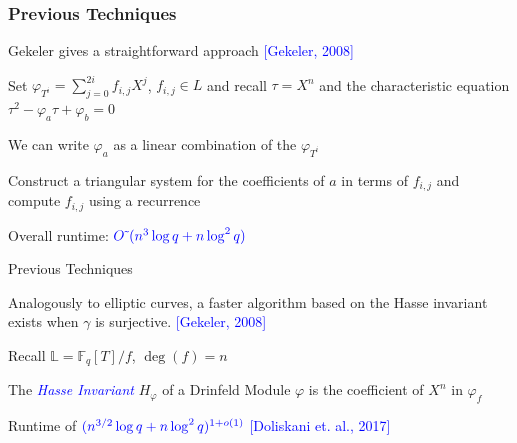 \documentclass{beamer}
\newcommand{\blue}{\textcolor{blue}}
\newcommand{\spa}{\vspace{0.2cm}}
\begin{document}





\begin{frame}
\frametitle{Previous Techniques}


     Gekeler gives a straightforward approach \blue{[Gekeler, 2008]}
     
     \spa
     
    Set $\varphi_{T^i} = \sum_{j=0}^{2i}f_{i,j} X^j$, $f_{i,j} \in L$ and recall $\tau = X^n$ and the characteristic equation $\tau^2 - \varphi_a\tau + \varphi_b = 0$
    
    \spa
    
    We can write $\varphi_a$ as a linear combination of the $\varphi_{T^i}$
    
    \spa
    
     Construct a triangular system for the coefficients of $a$ in terms of $f_{i,j}$ and compute $f_{i,j}$ using a recurrence
     
     \spa
     Overall runtime: $\blue{O\tilde{~}(n^3 \log q + n\log^2 q)}$



\end{frame}









\begin{frame}{Previous Techniques}


Analogously to elliptic curves, a faster algorithm based on the Hasse invariant exists when $\gamma$ is surjective. \blue{[Gekeler, 2008]}

\spa

Recall $\mathbb{L} = \mathbb{F}_q[T]/f$, $\deg(f) = n$

\begin{definition}
    \item The \blue{\textit{Hasse Invariant}} $H_{\varphi}$ of a Drinfeld Module $\varphi$ is the coefficient of $X^n$ in $\varphi_f$
\end{definition}

\spa

Runtime of $\blue{(n^{3/2} \log q + n \log^2 q)^{1+o(1)}}$ \blue{[Doliskani et. al., 2017]}








\end{frame}
\end{document}
